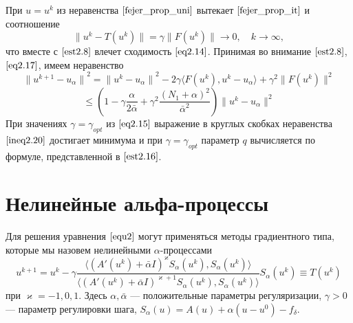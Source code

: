 При $u=u^k$ из неравенства $\eqref{fejer_prop_uni}$ вытекает $\eqref{fejer_prop_it}$ и соотношение
$$ \|u^k-T(u^k)\|=\gamma\|F(u^k)\|\to 0, \quad k\to\infty,$$ что вместе с $\eqref{est2.8}$ влечет сходимость $\eqref{eq2.14}$.
Принимая во внимание $\eqref{est2.8}$, $\eqref{eq2.17}$, имеем неравенство
$$ {\|u^{k+1}-u_\alpha\|}^2={\|u^k-u_\alpha\|}^2-2\gamma\langle F(u^k), u^k-u_\alpha\rangle+{\gamma}^2\|F(u^k)\|^2 $$
\begin{equation}\label{ineq2.20}
\le \left (1-\gamma\frac{\alpha}{2\bar\alpha}+{\gamma}^2\frac{(N_1+\alpha)^2}{{\bar\alpha}^2}\right )\|u^k-u_\alpha\|^2
\end{equation}
При значениях $\gamma={\gamma}_{opt}$ из $\eqref{eq2.15}$ выражение в круглых скобках неравенства $\eqref{ineq2.20}$ достигает минимума и при $\gamma={\gamma}_{opt}$ параметр $q$ вычисляется по формуле, представленной в $\eqref{est2.16}$.

\newpage
\section{Нелинейные альфа-процессы}
Для решения уравнения $\eqref{equ2}$ могут применяться методы градиентного типа, которые мы назовем нелинейными $\alpha$-процессами
\begin{equation}\label{equ_alphaproc}
u^{k+1}=u^k-\gamma\frac{\langle (A'(u^k)+\bar\alpha I)^{\varkappa}S_\alpha(u^k), S_\alpha(u^k)\rangle }{\langle(A'(u^k)+\bar\alpha I)^{\varkappa+1}S_\alpha(u^k), S_\alpha(u^k)\rangle }S_\alpha(u^k)\equiv{T(u^k)}
\end{equation}
при $\varkappa=-1,0,1$. Здесь $\alpha, \bar\alpha$ --- положительные параметры регуляризации, $\gamma>0$ --- параметр регулировки шага, $S_\alpha(u)=A(u)+\alpha(u-u^0)-f_\delta$.

